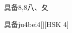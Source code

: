\begin{entry}{具备}{8,8}{⼋、⼡}
  \begin{phonetics}{具备}{ju4bei4}[][HSK 4]
  \end{phonetics}
\end{entry}
